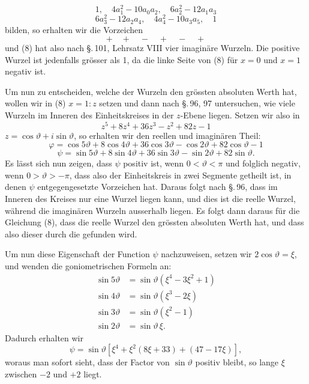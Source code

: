 \[
1, \quad 4a_1^2 - 10a_0a_2, \quad 6a_2^2 - 12a_1a_3
\]
\[
6a_3^2 - 12a_2a_4, \quad 4a_4^2 - 10a_3a_5, \quad 1
\]
bilden, so erhalten wir die Vorzeichen
\[
+ \quad + \quad - \quad + \quad - \quad +
\]
und (8) hat also nach \S.\,101, Lehrsatz VIII vier imaginäre Wurzeln. Die positive Wurzel ist jedenfalls grösser als 1, da die linke Seite von (8) für $x = 0$ und $x = 1$ negativ ist.

Um nun zu entscheiden, welche der Wurzeln den grössten absoluten Werth hat, wollen wir in (8) $x = 1 : z$ setzen und dann nach \S.\,96, 97 untersuchen, wie viele Wurzeln im Inneren des Einheitskreises in der $z$-Ebene liegen. Setzen wir also in
\[
z^5 + 8z^4 + 36z^3 - z^2 + 82z - 1
\]
$z = \cos\vartheta + i\sin\vartheta$, so erhalten wir den reellen und imaginären Theil:
\[
\varphi = \cos 5\vartheta + 8\cos 4\vartheta + 36\cos 3\vartheta - \cos 2\vartheta + 82\cos\vartheta - 1
\]
\[
\psi = \sin 5\vartheta + 8\sin 4\vartheta + 36\sin 3\vartheta - \sin 2\vartheta + 82\sin\vartheta.
\]
Es lässt sich nun zeigen, dass $\psi$ positiv ist, wenn $0 < \vartheta < \pi$ und folglich negativ, wenn $0 > \vartheta > -\pi$, dass also der Einheitskreis in zwei Segmente getheilt ist, in denen $\psi$ entgegengesetzte Vorzeichen hat. Daraus folgt nach \S.\,96, dass im Inneren des Kreises nur eine Wurzel liegen kann, und dies ist die reelle Wurzel, während die imaginären Wurzeln ausserhalb liegen. Es folgt dann daraus für die Gleichung (8), dass die reelle Wurzel den grössten absoluten Werth hat, und dass also dieser durch die  gefunden wird.

Um nun diese Eigenschaft der Function $\psi$ nachzuweisen, setzen wir $2\cos\vartheta = \xi$, und wenden die goniometrischen Formeln an:
\[
\begin{aligned}
\sin 5\vartheta &= \sin\vartheta(\xi^4 - 3\xi^2 + 1) \\
\sin 4\vartheta &= \sin\vartheta(\xi^3 - 2\xi) \\
\sin 3\vartheta &= \sin\vartheta(\xi^2 - 1) \\
\sin 2\vartheta &= \sin\vartheta\,\xi.
\end{aligned}
\]
Dadurch erhalten wir
\[
\psi = \sin\vartheta[\xi^4 + \xi^2(8\xi + 33) + (47 - 17\xi)],
\]
woraus man sofort sieht, dass der Factor von $\sin\vartheta$ positiv bleibt, so lange $\xi$ zwischen $-2$ und $+2$ liegt.
